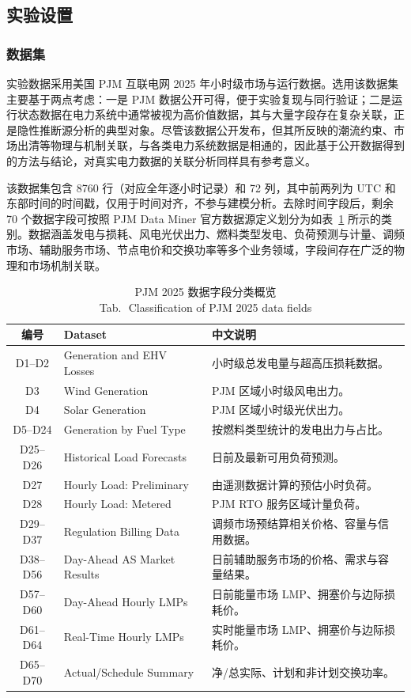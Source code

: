 \documentclass[UTF8,zihao=5,twoside]{ctexart}
\numberwithin{equation}{section}
\newcommand{\tabbicaption}[2]{%
  \caption{#1\\[-0.2em]\small Tab.\,\thetable\ #2}
}
\begin{document}
\subsection{实验设置}
\subsubsection{数据集}
实验数据采用美国 PJM 互联电网 2025 年小时级市场与运行数据\cite{ref-pjm-dataminer}。选用该数据集主要基于两点考虑：一是 PJM 数据公开可得，便于实验复现与同行验证；二是运行状态数据在电力系统中通常被视为高价值数据，其与大量字段存在复杂关联，正是隐性推断源分析的典型对象。尽管该数据公开发布，但其所反映的潮流约束、市场出清等物理与机制关联，与各类电力系统数据是相通的，因此基于公开数据得到的方法与结论，对真实电力数据的关联分析同样具有参考意义。

该数据集包含 8760 行（对应全年逐小时记录）和 72 列，其中前两列为 UTC 和东部时间的时间戳，仅用于时间对齐，不参与建模分析。去除时间字段后，剩余 70 个数据字段可按照 PJM Data Miner 官方数据源定义划分为如表~\ref{tab:data_overview} 所示的类别。数据涵盖发电与损耗、风电光伏出力、燃料类型发电、负荷预测与计量、调频市场、辅助服务市场、节点电价和交换功率等多个业务领域，字段间存在广泛的物理和市场机制关联。

\begin{table}[!htbp]
\centering
\scriptsize
\setlength{\tabcolsep}{2pt}
\tabbicaption{PJM 2025 数据字段分类概览}{Classification of PJM 2025 data fields}
\label{tab:data_overview}
\begin{tabularx}{\columnwidth}{c>{\raggedright\arraybackslash}p{}X}
\toprule
编号 & Dataset & 中文说明 \\
\midrule
D1--D2 & Generation and EHV Losses & 小时级总发电量与超高压损耗数据。 \\
D3 & Wind Generation & PJM 区域小时级风电出力。 \\
D4 & Solar Generation & PJM 区域小时级光伏出力。 \\
D5--D24 & Generation by Fuel Type & 按燃料类型统计的发电出力与占比。 \\
D25--D26 & Historical Load Forecasts & 日前及最新可用负荷预测。 \\
D27 & Hourly Load: Preliminary & 由遥测数据计算的预估小时负荷。 \\
D28 & Hourly Load: Metered & PJM RTO 服务区域计量负荷。 \\
D29--D37 & Regulation Billing Data & 调频市场预结算相关价格、容量与信用数据。 \\
D38--D56 & Day-Ahead AS Market Results & 日前辅助服务市场的价格、需求与容量结果。 \\
D57--D60 & Day-Ahead Hourly LMPs & 日前能量市场 LMP、拥塞价与边际损耗价。 \\
D61--D64 & Real-Time Hourly LMPs & 实时能量市场 LMP、拥塞价与边际损耗价。 \\
D65--D70 & Actual/Schedule Summary & 净/总实际、计划和非计划交换功率。 \\
\bottomrule
\end{tabularx}
\end{table}
\end{document}
